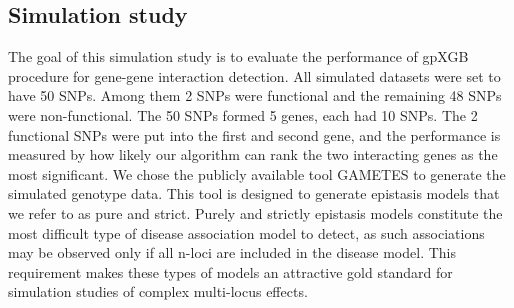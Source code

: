 \documentclass[11pt]{article}
\theoremstyle{plain}
\theoremstyle{definition}
\theoremstyle{remark}
\begin{document}





\subsection{Simulation study}

The goal of this simulation study is to evaluate the performance of gpXGB procedure for gene-gene interaction detection. All simulated datasets were set to have 50 SNPs. Among them 2 SNPs were functional and the remaining 48 SNPs were non-functional. The 50 SNPs formed 5 genes, each had 10 SNPs. The 2 functional SNPs were put into the first and second gene, and the performance is measured by how likely our algorithm can rank the two interacting genes as the most significant. We chose the publicly available tool GAMETES \cite{11} to generate the simulated genotype data. This tool is designed to generate epistasis models that we refer to as pure and strict. Purely and strictly epistasis models constitute the most difficult type of disease association model to detect, as such associations may be observed only if all n-loci are included in the disease model. This requirement makes these types of models an attractive gold standard for simulation studies of complex multi-locus effects. \\
\end{document}
